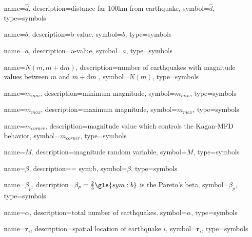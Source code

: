{
	name={\ensuremath{\hat{d}}},
	description={distance far 100km from earthquake},
	symbol={\ensuremath{\hat{d}}},
	type=symbols
}


{
	name={\ensuremath{b}},
	description={b-value}, 
	symbol={\ensuremath{b}},
	type=symbols
}


{
	name={\ensuremath{a}},
	description={a-value},
	symbol={\ensuremath{a}},
	type=symbols
}


{
	name={\ensuremath{N(m,m+\mathrm{d}m)}},
	description={number of earthquakes with magnitude values between $m$ and $m + \mathrm{d}m$ },
	symbol={\ensuremath{N(m)}},
	type=symbols
}


{
	name={\ensuremath{m_{min}}},
	description={minimum magnitude},
	symbol={\ensuremath{m_{min}}},
	type=symbols
}

{
	name={\ensuremath{m_{max}}},
	description={maximum magnitude},
	symbol={\ensuremath{m_{max}}},
	type=symbols
}




{
	name={\ensuremath{m_{corner}}},
	description={magnitude value which controls the Kagan-MFD behavior},
	symbol={\ensuremath{m_{corner}}},
	type=symbols
}

{
	name={\ensuremath{M}},
	description={magnitude random variable},
	symbol={\ensuremath{M}},
	type=symbols
}

{
	name={\ensuremath{\beta}},
	description={\beta = \gls{sym:b}},
	symbol={\ensuremath{\beta}},
	type=symbols
}

{
	name={\ensuremath{\beta_p}},
	description={$\beta_p = \frac{2}{3}\gls{sym:b}$ is the Pareto's beta},
	symbol={\ensuremath{\beta_p}},
	type=symbols
}

{
	name={\ensuremath{\alpha}},
	description={total number of earthquakes},
	symbol={\ensuremath{\alpha}},
	type=symbols
}


{
	name={\ensuremath{\boldsymbol{r}_i}},
	description={spatial location of earthquake $i$},
	symbol={\ensuremath{\boldsymbol{r}_i}},
	type=symbols
}



